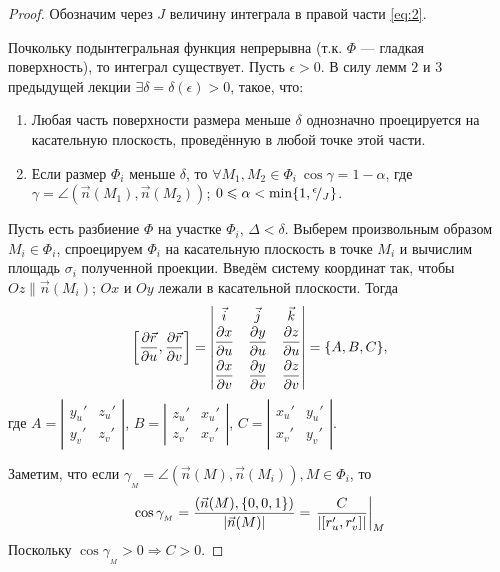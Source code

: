 \documentclass[a4paper,10pt]{article}
\begin{document}
	\begin{proof}
		Обозначим через $J$ величину интеграла в правой части \eqref{eq:2}.
		
		Почкольку подынтегральная функция непрерывна (т.к. $\Phi$ --- гладкая поверхность), то интеграл существует. Пусть $\epsilon > 0$. В силу лемм $2$ и $3$ предыдущей лекции $\exists \delta = \delta(\epsilon) > 0$, такое, что:
		\begin{enumerate}
			\item Любая часть поверхности размера меньше $\delta$ однозначно проецируется на касательную плоскость, проведённую в любой точке этой части.
			\item Если размер $\Phi_i$ меньше $\delta$, то $\forall M_1, M_2 \in \Phi_i ~ \cos \gamma = 1 - \alpha$, где \\ $\gamma = \angle(\vec{n}(M_1), \vec{n}(M_2))$; $0 \leqslant \alpha < \min\{1, {}^{\epsilon}\!/_{J}\}$.
		\end{enumerate}
		Пусть есть разбиение $\Phi$ на участке $\Phi_i$, $\Delta < \delta$. Выберем произвольным образом $M_i \in \Phi_i$, спроецируем $\Phi_i$ на касательную плоскость в точке $M_i$ и вычислим площадь $\sigma_i$ полученной проекции. Введём систему координат так, чтобы $Oz \parallel \vec{n}(M_i)$; $Ox$ и $Oy$ лежали в касательной плоскости. Тогда $$\left[ \dfrac{\partial \vec{r}}{\partial u}, \dfrac{\partial \vec{r}}{\partial v} \right] = \left| 
		\begin{matrix}
		\vec{i} & \vec{j} & \vec{k} \\[.1em]
		\dfrac{\partial x}{\partial u} & \dfrac{\partial y}{\partial u} & \dfrac{\partial z}{\partial u} \\[.7em]
		\dfrac{\partial x}{\partial v} & \dfrac{\partial y}{\partial v} & \dfrac{\partial z}{\partial v}
		\end{matrix} 
		\right| = \{A, B, C\},$$
		где $A = \left| \begin{matrix} y_u' & z_u' \\ y_v' & z_v' \end{matrix} \right|$, $B = \left| \begin{matrix} z_u' & x_u' \\ z_v' & x_v' \end{matrix} \right|$, $C = \left| \begin{matrix} x_u' & y_u' \\ x_v' & y_v' \end{matrix} \right|$.
		
		Заметим, что если $\gamma_{{}_M} = \angle(\vec{n}(M), \vec{n}(M_i)), M \in \Phi_i$, то  
		$$\cos \gamma_{{}_M} = \dfrac{(\vec{n}(M), \{0, 0, 1\})}{|\vec{n}(M)|} \hm{=} \left. \dfrac{C}{|[r_u', r_v']|} \right|_M$$
		Поскольку $\cos \gamma_{{}_M} > 0\Rightarrow C > 0$.
		

\end{proof}
\end{document}
